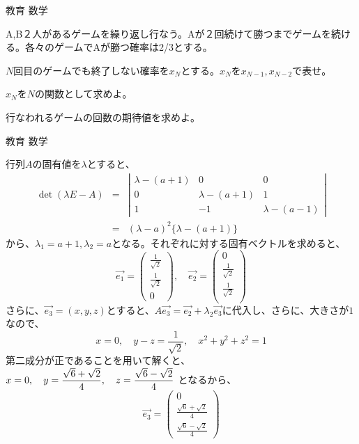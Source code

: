\documentclass[fleqn]{jbook}
\begin{document}
\begin{question}{教育 数学}{}
\begin{subquestions}
\SubQuestion
A,B２人があるゲームを繰り返し行なう。Aが２回続けて勝つまでゲームを続ける。各々のゲームでAが勝つ確率は2/3とする。

\begin{subsubquestions}
\SubSubQuestion
$N$回目のゲームでも終了しない確率を$x_N$とする。$x_N$を$x_{N-1}, x_{N-2}$で表せ。

\SubSubQuestion
$x_N$を$N$の関数として求めよ。

\SubSubQuestion
行なわれるゲームの回数の期待値を求めよ。

\end{subsubquestions}
\end{subquestions}
\end{question}
\begin{answer}{教育 数学}{}
\begin{subanswers}
\SubAnswer
\begin{subsubanswers}
\SubSubAnswer

行列$A$の固有値を$\lambda$とすると、
\begin{eqnarray*}
\det(\lambda E -A) & = & \left| \begin{array}{ccc}
\lambda-(a+1) & 0 & 0 \\
0 & \lambda-(a+1) & 1 \\
1 & -1 & \lambda-(a-1) 
\end{array}\right| \\
 & = & (\lambda - a)^2 \{ \lambda-(a+1) \}
\end{eqnarray*}
から、$\lambda_1=a+1,\lambda_2=a$となる。それぞれに対する固有ベクトルを求めると、
\[ \vec{e_1}=\left( \begin{array}{c}
\frac{1}{\sqrt{2}} \\
\frac{1}{\sqrt{2}} \\
0
\end{array}\right)
, \quad 
\vec{e_2}=\left( \begin{array}{c}
0 \\
\frac{1}{\sqrt{2}} \\
\frac{1}{\sqrt{2}} \\
\end{array}\right)
\]
さらに、$\vec{e_3}=(x,y,z)$とすると、$A\vec{e_3}=\vec{e_2}+\lambda_2 \vec{e_3}$に代入し、さらに、大きさが$1$なので、
\[ x=0 , \quad y-z=\frac{1}{\sqrt{2}}, \quad x^2+y^2+z^2=1 \]
第二成分が正であることを用いて解くと、$\displaystyle{x=0, \quad  y=\frac{\sqrt{6}+\sqrt{2}}{4} , \quad z=\frac{\sqrt{6}-\sqrt{2}}{4}}$
となるから、
\[ \vec{e_3}=\left( \begin{array}{c}
0 \\
\frac{\sqrt{6}+\sqrt{2}}{4} \\
\frac{\sqrt{6}-\sqrt{2}}{4}
\end{array}\right)
\]


\end{subsubanswers}
\end{subanswers}
\end{answer}
\end{document}
